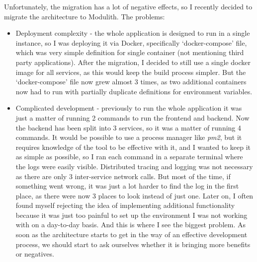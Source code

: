 Unfortunately, the migration has a lot of negative effects, so I recently decided to migrate the architecture to Modulith. The problems:
\begin{itemize}
    \item Deployment complexity - the whole application is designed to run in a single instance, so I was deploying it via Docker, specifically `docker-compose' file, which was very simple definition for single container (not mentioning third party applications). After the migration, I decided to still use a single docker image for all services, as this would keep the build process simpler. But the `docker-compose' file now grew almost 3 times, as two additional containers now had to run with partially duplicate definitions for environment variables.
    \item Complicated development - previously to run the whole application it was just a matter of running 2 commands to run the frontend and backend. Now the backend has been split into 3 services, so it was a matter of running 4 commands. It would be possible to use a process manager like \textit{pm2}, but it requires knowledge of the tool to be effective with it, and I wanted to keep it as simple as possible, so I ran each command in a separate terminal where the logs were easily visible. Distributed tracing and logging was not necessary as there are only 3 inter-service network calls. But most of the time, if something went wrong, it was just a lot harder to find the log in the first place, as there were now 3 places to look instead of just one. Later on, I often found myself rejecting the idea of implementing additional functionality because it was just too painful to set up the environment I was not working with on a day-to-day basis. And this is where I see the biggest problem. As soon as the architecture starts to get in the way of an effective development process, we should start to ask ourselves whether it is bringing more benefits or negatives.

\end{itemize}
